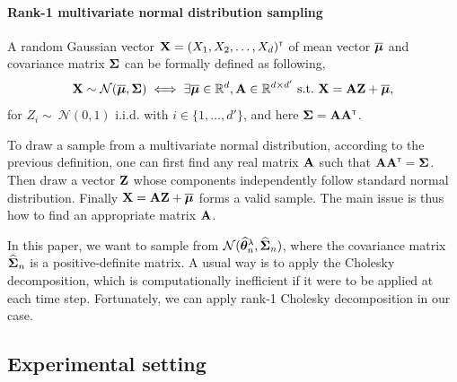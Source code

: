 \paragraph{Rank-1 multivariate normal distribution sampling}

A random Gaussian vector ${\bf X} = (X_1, X_2, \ldots, X_d)^\mathsf{\scriptscriptstyle T}$ of mean vector $\overline{{\boldsymbol \mu}}$ and covariance matrix ${\boldsymbol \Sigma}$ can be formally defined as following,
\[
\bX \sim \cN(\bar{\bmu}, \bSigma) \iff \exists \bar{\bmu}\in\mathbb{R}^d,\bA\in\mathbb{R}^{d\times d'} \ \text{s.t.} \ \bX = \bA \mathbf{Z} + \bar{\bmu},
\]
for $Z_i \sim\ \mathcal{N}(0, 1)$ i.i.d. with $i\in\{1,\ldots,d'\}$, and here ${\boldsymbol \Sigma} = {\bf A}{\bf A}^\mathsf{\scriptscriptstyle T}$.

To draw a sample from a multivariate normal distribution, according to the previous definition, one can first find any real matrix ${\bf A}$ such that ${\bf A}{\bf A}^\mathsf{\scriptscriptstyle T} = {\boldsymbol \Sigma}$. Then draw a vector ${\bf Z}$ whose components independently follow standard normal distribution. Finally ${\bf X} = {\bf A} \mathbf{Z} + \overline{{\boldsymbol \mu}}$ forms a valid sample. The main issue is thus how to find an appropriate matrix ${\bf A}$.

In this paper, we want to sample from $\mathcal{N}(\widehat{{\boldsymbol \theta}}^\lambda_n,\widehat{{\boldsymbol \Sigma}}_n)$, where the covariance matrix $\widehat{{\boldsymbol \Sigma}}_n$ is a positive-definite matrix. A usual way is to apply the Cholesky decomposition, which is computationally inefficient if it were to be applied at each time step. Fortunately, we can apply rank-1 Cholesky decomposition in our case.  



\subsection{Experimental setting}\label{sec:lgc.experiments.setting}

